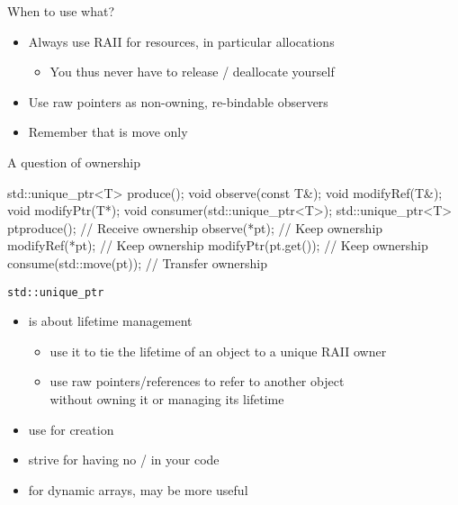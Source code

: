 \begin{frame}[fragile]
  \begin{block}{When to use what?}
    \begin{itemize}
    \item Always use RAII for resources, in particular allocations
    \begin{itemize}
      \item You thus never have to release / deallocate yourself
    \end{itemize}
    \item Use raw pointers as non-owning, re-bindable observers
    \item Remember that  is move only
    \end{itemize}
  \end{block}
  \pause
  \begin{exampleblock}{A question of ownership}
    \small
    \begin{cppcode*}{}
      std::unique_ptr<T> produce();
      void observe(const T&);
      void modifyRef(T&);
      void modifyPtr(T*);
      void consumer(std::unique_ptr<T>);
      std::unique_ptr<T> pt{produce()}; // Receive ownership
      observe(*pt);                     // Keep ownership
      modifyRef(*pt);                   // Keep ownership
      modifyPtr(pt.get());              // Keep ownership
      consume(std::move(pt));           // Transfer ownership
    \end{cppcode*}
  \end{exampleblock}
\end{frame}

\begin{frame}[fragile]
  \begin{goodpractice}{\texttt{std::unique\_ptr}}
    \begin{itemize}
      \item {} is about lifetime management
      \begin{itemize}
        \item use it to tie the lifetime of an object to a unique RAII owner
        \item use raw pointers/references to refer to another object\\
              without owning it or managing its lifetime
      \end{itemize}
      \item use  for creation
      \item strive for having no / in your code
      \item for dynamic arrays,  may be more useful
    \end{itemize}
  \end{goodpractice}
\end{frame}

